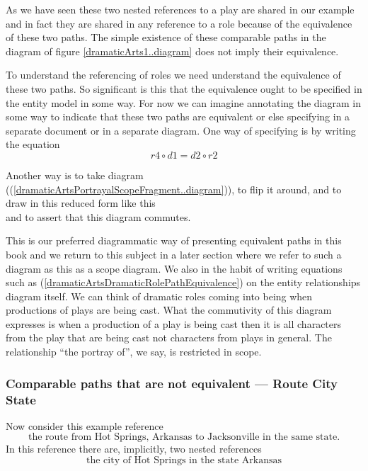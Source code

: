 \begin{reinstatett}
As we have seen these two nested references to a play are shared in our example and in fact they are shared in any reference to a role because of
the equivalence of these two paths. 
The simple existence of these comparable paths in the diagram of figure \ref{dramaticArts1..diagram}
does not imply their equivalence.

To understand the referencing of roles we need understand the equivalence of these two paths. 
So significant is this that the equivalence ought to be specified in the entity model in some way.
For now we can imagine annotating the diagram in some way to indicate that these two paths are equivalent 
or else specifying in a separate document or in a separate diagram. 
One way of specifying is by writing the equation
\begin{equation}
\label{dramaticArtsDramaticRolePathEquivalence}
r4 \circ d1 = d2 \circ r2
\end{equation}

Another way is to take diagram ((\ref{dramaticArtsPortrayalScopeFragment..diagram})), 
to flip it  around, and to draw  in this reduced form like this
\begin{equation}
\label{dramaticArtsPortrayalScopeAppearance1}

\end{equation}
and to assert that this diagram commutes.

This is our preferred diagrammatic way of presenting equivalent paths in this book and we return to this subject in a later section where we refer to such a diagram as this as a scope diagram. 
We also in the habit of writing equations such as (\ref{dramaticArtsDramaticRolePathEquivalence}) on the entity relationships diagram itself.
We can think of dramatic roles coming into being when productions of plays are being cast. What the commutivity of this diagram expresses is when a production of a play is being cast then it is all characters from the play that are being cast not characters from plays in general. 
The relationship ``the portray of'', we say, is restricted in scope.
\end{reinstatett}
\subsubsection {Comparable paths that are not equivalent --- Route City State}
\mynote {}
Now consider this example reference
\begin{equation}
\mbox{the route from Hot Springs, Arkansas to Jacksonville in the same state.}
\end{equation}
In this reference there are, implicitly, two nested references
\begin{equation}
\mbox{the city of Hot Springs in the state  Arkansas}
\end{equation}

